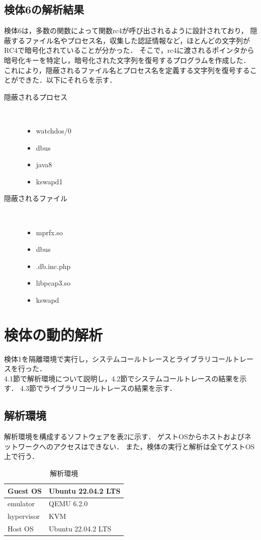 \documentclass[submit,techreq,noauthor]{eco}	%
\begin{document}
\subsection{検体6の解析結果}
検体6は，多数の関数によって関数rc4が呼び出されるように設計されており，
隠蔽するファイル名やプロセス名，収集した認証情報など，ほとんどの文字列がRC4で暗号化されていることが分かった．
そこで，rc4に渡されるポインタから暗号化キーを特定し，暗号化された文字列を復号するプログラムを作成した．
これにより，隠蔽されるファイル名とプロセス名を定義する文字列を復号することができた．以下にそれらを示す．
\begin{description}
  \item[隠蔽されるプロセス]　
  \begin{itemize}
    \item \lbrack watchdos/0\rbrack
    \item dbus
    \item java8
    \item \lbrack kswapd1\rbrack
  \end{itemize}
  \item[隠蔽されるファイル]　
  \begin{itemize}
    \item mprfx.so
    \item dbus
    \item .db.inc.php
    \item libpcap3.so
    \item kswapd\\
  \end{itemize}
\end{description}

\section{検体の動的解析}
検体1を隔離環境で実行し，システムコールトレースとライブラリコールトレースを行った．\\
\indent
4.1節で解析環境について説明し，4.2節でシステムコールトレースの結果を示す．
4.3節でライブラリコールトレースの結果を示す．

\subsection{解析環境}
解析環境を構成するソフトウェアを表2に示す．
ゲストOSからホストおよびネットワークへのアクセスはできない．
また，検体の実行と解析は全てゲストOS上で行う．

\begin{table}[H]
  \caption{解析環境}
  \label{table: 解析環境}
  \centering
  \begin{tabular}{|l|l|}
  \hline
  Guest OS   & Ubuntu 22.04.2 LTS \\ \hline
  emulator   & QEMU 6.2.0         \\ \hline
  hypervisor & KVM                \\ \hline
  Host OS    & Ubuntu 22.04.2 LTS \\ \hline
  \end{tabular}
\end{table}
\end{document}
